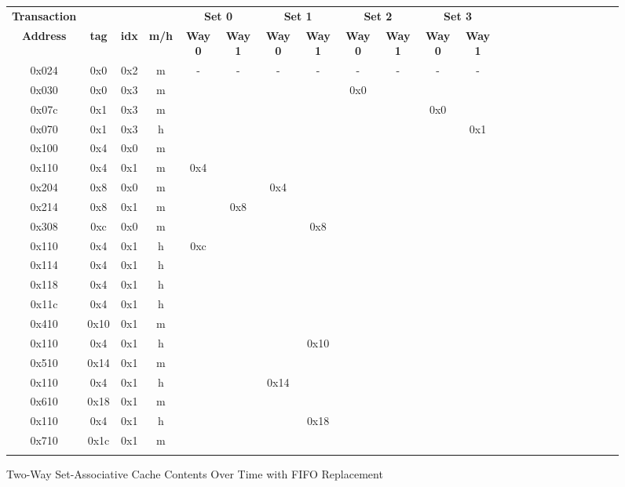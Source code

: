 \documentclass[10pt]{article}
\begin{document}
\begin{figure}[H]
\centering
\begin{tabular}{@{\extracolsep{3pt}}cccccccccccc@{}}
\Xhline{2\arrayrulewidth}
\textbf{Transaction} & & & & \multicolumn{2}{c}{\textbf{Set 0}} & \multicolumn{2}{c}{\textbf{Set 1}} & \multicolumn{2}{c}{\textbf{Set 2}} & \multicolumn{2}{c}{\textbf{Set 3}} \\
\cline{5-6}
\cline{7-8}
\cline{9-10}
\cline{11-12}
\textbf{Address} & \textbf{tag} & \textbf{idx} & \textbf{m/h} & \textbf{Way 0} & \textbf{Way 1} & \textbf{Way 0} & \textbf{Way 1} & \textbf{Way 0} & \textbf{Way 1} & \textbf{Way 0} & \textbf{Way 1} \\
\Xhline{2\arrayrulewidth}
0x024 & 0x0 & 0x2 & m &  -  &  -  &  -  &  -  &  -  &  -  &  -  &  -  \\
0x030 & 0x0 & 0x3 & m &     &     &     &     & 0x0 &     &     &     \\
0x07c & 0x1 & 0x3 & m &     &     &     &     &     &     & 0x0 &     \\
0x070 & 0x1 & 0x3 & h &     &     &     &     &     &     &     & 0x1 \\
0x100 & 0x4 & 0x0 & m &     &     &     &     &     &     &     &     \\
0x110 & 0x4 & 0x1 & m & 0x4 &     &     &     &     &     &     &     \\
0x204 & 0x8 & 0x0 & m &     &     & 0x4 &     &     &     &     &     \\
0x214 & 0x8 & 0x1 & m &     & 0x8 &     &     &     &     &     &     \\
0x308 & 0xc & 0x0 & m &     &     &     & 0x8 &     &     &     &     \\
0x110 & 0x4 & 0x1 & h & 0xc &     &     &     &     &     &     &     \\
0x114 & 0x4 & 0x1 & h &     &     &     &     &     &     &     &     \\
0x118 & 0x4 & 0x1 & h &     &     &     &     &     &     &     &     \\
0x11c & 0x4 & 0x1 & h &     &     &     &     &     &     &     &     \\
0x410 & 0x10& 0x1 & m &     &     &     &     &     &     &     &     \\
0x110 & 0x4 & 0x1 & h &     &     &     & 0x10&     &     &     &     \\
0x510 & 0x14& 0x1 & m &     &     &     &     &     &     &     &     \\
0x110 & 0x4 & 0x1 & h &     &     & 0x14&     &     &     &     &     \\
0x610 & 0x18& 0x1 & m &     &     &     &     &     &     &     &     \\
0x110 & 0x4 & 0x1 & h &     &     &     & 0x18&     &     &     &     \\
0x710 & 0x1c& 0x1 & m &     &     &     &     &     &     &     &     \\
\Xhline{2\arrayrulewidth}
\multicolumn{12}{l}{\textbf{Number of Misses = 14}}
\hline
\multicolumn{12}{l}{\textbf{Miss Rate = 0.7}}
\Xhline{2\arrayrulewidth}
\end{tabular}
\caption{Two-Way Set-Associative Cache Contents Over Time with FIFO Replacement}
\end{figure}

\subsection{}
\end{document}
